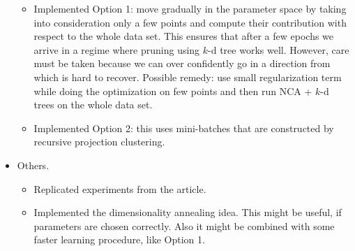 \documentclass[]{article}
\begin{document}
\begin{itemize}
\begin{itemize}
        \item Implemented Option 1: move gradually in the parameter space by taking into consideration only a few points and compute their contribution with respect to the whole data set. This ensures that after a few epochs we arrive in a regime where pruning using $k$-d tree works well. However, care must be taken because we can over confidently go in a direction from which is hard to recover. Possible remedy: use small regularization term while doing the optimization on few points and then run NCA + $k$-d trees on the whole data set.
        \item Implemented Option 2: this uses mini-batches that are constructed by recursive projection clustering.
      \end{itemize}
    \item Others.
      \begin{itemize}
        \item Replicated experiments from the article.
        \item Implemented the dimensionality annealing idea. This might be useful, if parameters are chosen correctly. Also it might be combined with some faster learning procedure, like Option 1.
      \end{itemize}
  \end{itemize}
\end{document}
